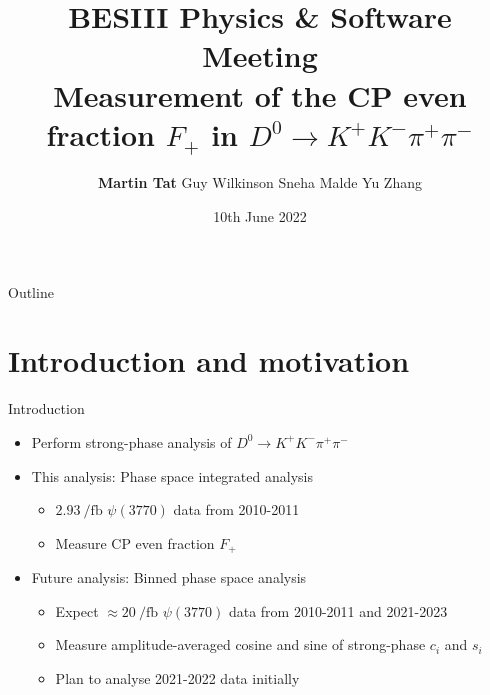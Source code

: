 \documentclass{beamer}
\title[University of Oxford]{BESIII Physics \& Software Meeting \\Measurement of the CP even fraction \texorpdfstring{$F_+$}{F+} in \texorpdfstring{$D^0\to K^+K^-\pi^+\pi^-$}{D2KKpipi}}
\author[Martin Tat]{\textbf{Martin Tat} \hspace{0.54em} Guy Wilkinson \hspace{0.54em} Sneha Malde \hspace{0.54em} Yu Zhang}
\institute{University of Oxford}
\date{10th June 2022}
\begin{document}
\begin{frame}
  \titlepage
\end{frame}

\begin{frame}{Outline}
  \tableofcontents
\end{frame}

\section{Introduction and motivation}

\begin{frame}{Introduction}
  \begin{itemize}
    \setlength\itemsep{1.5em}
    \item{Perform strong-phase analysis of $D^0\to K^+K^-\pi^+\pi^-$}
    \item{This analysis: Phase space integrated analysis}
    \begin{itemize}
      \item{$\SI{2.93}{\per\femto\barn}$ $\psi(3770)$ data from 2010-2011}
      \item{Measure CP even fraction $F_+$}
    \end{itemize}
    \item{Future analysis: Binned phase space analysis}
    \begin{itemize}
      \item{Expect $\approx\SI{20}{\per\femto\barn}$ $\psi(3770)$ data from 2010-2011 and 2021-2023}
      \item{Measure amplitude-averaged cosine and sine of strong-phase $c_i$ and $s_i$}
      \item{Plan to analyse 2021-2022 data initially}
    \end{itemize}
  \end{itemize}
\end{frame}
\end{document}
